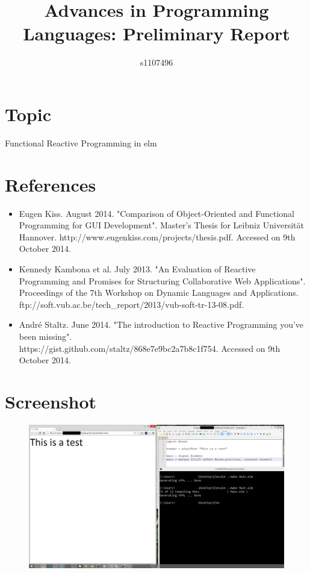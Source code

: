 \documentclass{article}
\begin{document}
\title{Advances in Programming Languages: Preliminary Report}
\author{s1107496}

\maketitle

\section{Topic}
Functional Reactive Programming in elm

\section{References}
\begin{itemize}
\item Eugen Kiss. August 2014. "Comparison of Object-Oriented and Functional Programming for GUI Development". Master's Thesis for Leibniz Universität Hannover. http://www.eugenkiss.com/projects/thesis.pdf. Accessed on 9th October 2014.
\item Kennedy Kambona et al. July 2013. "An Evaluation of Reactive Programming and Promises for Structuring Collaborative Web Applications". Proceedings of the 7th Workshop on Dynamic Languages and Applications. ftp://soft.vub.ac.be/tech\_report/2013/vub-soft-tr-13-08.pdf.
\item André Staltz. June 2014. "The introduction to Reactive Programming you've been missing". \\ https://gist.github.com/staltz/868e7e9bc2a7b8c1f754. Accessed on 9th October 2014.
\end{itemize}

\section{Screenshot}
\begin{figure}[ht!]
\centering
\includegraphics[width=160mm]{elm_screenshot.png}
\end{figure}
\end{document}
